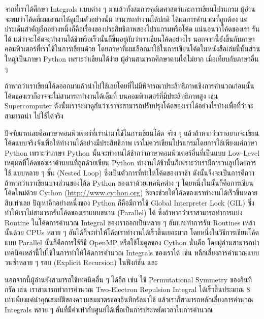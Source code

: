 จากที่เราได้ศึกษา Integrals แบบต่าง ๆ มาแล้วทั้งสมการคณิตศาสตร์และการเขียนโปรแกรม ผู้อ่านจะพบว่าโค้ดที่ผมเอามาให้ดูเป็นตัวอย่างนั้น%
สามารถทำงานได้ปกติ ได้ผลการคำนวณที่ถูกต้อง แต่ประเด็นสำคัญอีกอย่างหนึ่งก็คือเรื่องของประสิทธิภาพของโปรแกรมหรือโค้ด แน่นอนว่าโค้ดของเรา%
รันได้ แต่ว่าจะโค้ดจะทำงานได้ช้าหรือเร็วนั้นก็ขึ้นอยู่กับว่าเราเขียนโค้ดอย่างไร นอกจากนี้ยังขึ้นกับภาษาคอมพิวเตอร์ที่เราใช้ในการเขียนด้วย 
โดยภาษาที่ผมเลือกมาใช้ในการเขียนโค้ดในหนังสือเล่มนี้นั้นส่วนใหญ่เป็นภาษา Python เพราะว่าเขียนได้ง่าย ผู้อ่านสามารถศึกษาตามได้ไม่ยาก%
เมื่อเทียบกับภาษาอื่น ๆ 

ถ้าหากว่าเราเขียนโค้ดออกมาแล้วนำไปใช้เลยโดยที่ไม่มีพิจารณาประสิทธิภาพเชิงการคำนวณก่อนนั้น โค้ดของเราก็อาจจะไม่สามารถทำงานได้เต็มที่%
บนคอมพิวเตอร์ที่มีประสิทธิภาพสูง เช่น Supercomputer ดังนั้นเราจะมาดูกันว่าเราจะสามารถปรับปรุงโค้ดของเราได้อย่างไรบ้างเพื่อที่ว่าจะสามารถนำ%
ไปใช้ได้จริง

ปัจจัยแรกเลยคือภาษาคอมพิวเตอร์ที่เรานำมาใช้ในการเขียนโค้ด จริง ๆ แล้วถ้าหากว่าเราอยากจะเขียนโค้ดแบบจริงจังเพื่อให้ทำงานได้อย่างมีประสิทธิภาพ 
เราไม่ควรเขียนโปรแกรมโดยการใช้เพียงแค่ภาษา Python เพราะว่าภาษา Python นั้นจะทำงานได้ช้ากว่าภาษาคอมพิวเตอร์อื่นที่เป็นแบบ Low-Level 
เหตุผลที่โค้ดของเราด้านบนที่ถูกด้วยเขียน Python ทำงานได้ช้านั้นก็เพราะว่าเรามีการวนลูปโดยการใช้  แบบหลาย ๆ ชั้น (Nested 
Loop) ซึ่งเป็นตัวการที่ทำให้โค้ดของเราช้า ดังนั้นจึงจะเป็นการดีกว่าถ้าหากว่าเราเขียนบางส่วนของโค้ด Python ของเราด้วยเทคนิคต่าง ๆ 
โดยหนึ่งในนั้นก็คือการเขียนโค้ดใหม่ด้วย Cython (\url{http://www.cython.org}) ซึ่งจะช่วยให้โค้ดของเราทำงานได้เร็วขึ้นหลายสิบเท่าเลย
ปัญหาอีกอย่างหนึ่งของ Python ก็คือมีการใช้ Global Interpreter Lock (GIL) ซึ่งทำให้เราไม่สามารถรันโค้ดของเราแบบขนาน (Parallel) ได้ 
ซึ่งถ้าหากว่าเราสามารถทำการแบ่ง Routine ในโค้ดการคำนวณ Integral ของเราออกเป็นหลาย ๆ อันและทำการรัน Routines เหล่านั้นด้วย 
CPUs หลาย ๆ อันได้ก็จะทำให้โค้ดเราทำงานได้เร็วขึ้นเยอะมาก โดยหนึ่งในวิธีการเขียนโค้ดแบบ Parallel นั้นก็คือการใช้วิธี OpenMP 
หรือใช้โมดูลของ Cython นั่นคือ  โดยผู้อ่านสามารถนำเทคนิคเหล่านี้ไปใช้ในการทำให้โค้ดการคำนวณ Integrals  
ของเราได้ เช่น หลีกเลี่ยงการคำนวณแบบวนซ้ำหลาย ๆ รอบ (Explicit Recursion) ในฟังก์ชัน  และ  

นอกจากนี้ผู้อ่านยังสามารถใช้เทคนิคอื่น ๆ ได้อีก เช่น ใช้ Permutational Symmetry ของอินทิกรัล เช่น เราสามารถทำการคำนวณ Two-Electron 
Repulsion Integral ได้เร็วขึ้นประมาณ 8 เท่าเพียงแค่นำคุณสมบัติของความสมมาตรของอินทิกรัลมาใช้ แล้วเราก็สามารถหลักเลี่ยงการคำนวณ
Integrals หลาย ๆ อันที่มีค่าเท่ากับศูนย์ได้เพื่อเป็นการประหยัดเวลาในการคำนวณ

